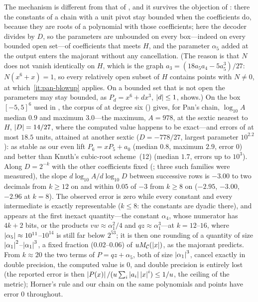 The mechanism is different from that of , and
it survives the objection of : there the
constants of a chain with a unit pivot stay bounded when the coefficients do,
because they are roots of a polynomial with those coefficients; here the
decoder divides by $D$, so the parameters are unbounded on every box---indeed
on every bounded open set---of coefficients that meets $H$, and the parameter
$\alpha_5$ added at the output enters the majorant without any cancellation.
(The reason is that $N$ does not vanish identically on $H$, which is the graph
$a_3=(18a_5a_4-5a_5^3)/27$: $N(x^6+x)=1$, so every relatively open subset of
$H$ contains points with $N\ne0$, at which~\ref{it:pan-blowup} applies.  On a
bounded set that is not open the parameters may stay bounded, as
$P_d=x^6+dx^3$, $\left\lvert d\right\rvert\le1$, shows.)  On the box $[-5,5]^6$ used in
, the corpus of  at degree six
() gives, for Pan's chain, $\log_{10}A$ median $0.9$ and
maximum $3.0$---the maximum, $A=978$, at the sextic nearest to $H$,
$\left\lvert D\right\rvert=14/27$, where the computed value happens to be exact---and errors of
at most $18.5$ units, attained at another sextic ($D=-778/27$, largest
parameter $10^{2.2}$): as stable as our even lift $P_6=xP_5+a_0$ (median
$0.8$, maximum $2.9$, error $0$) and better than Knuth's cubic-root
scheme~(12) (median $1.7$, errors up to $10^3$).  Along $D=2^{-k}$ with the
other coefficients fixed (; three such families
were measured), the slope $d\log_{10}A/d\log_{10}D$ between successive rows is
$-3.00$ to two decimals from $k\ge12$ on and within $0.05$ of $-3$ from
$k\ge8$ on ($-2.95$, $-3.00$, $-2.96$ at $k=8$).  The observed error is zero
while every constant and every intermediate is exactly representable ($k\le8$:
the constants are dyadic there), and appears at the first inexact
quantity---the constant $\alpha_4$, whose numerator has $4k+2$ bits, or the
products $vw\approx\alpha_1^2/4$ and $qz\approx\alpha_1^3$---at $k=12$--$16$,
where $\left\lvert \alpha_5\right\rvert\approx10^{11}$--$10^{14}$ is still far below $2^{53}$; it
is then one rounding of a quantity of size $\left\lvert \alpha_1\right\rvert^2$--$\left\lvert \alpha_1\right\rvert^3$,
a fixed fraction ($0.02$--$0.06$) of $uM_{\mathcal C}(\left\lvert x\right\rvert)$, as the majorant
predicts.  From $k\approx20$ the two terms of $P=qz+\alpha_5$, both of size
$\left\lvert \alpha_1\right\rvert^3$, cancel exactly in double precision, the computed value is
$0$, and double precision is entirely lost (the reported error is then
$\left\lvert P(x)\right\rvert/(u\sum_i\left\lvert a_i\right\rvert\left\lvert x\right\rvert^i)\le1/u$, the ceiling of the metric);
Horner's rule and our chain on the same polynomials and points have error $0$
throughout.

